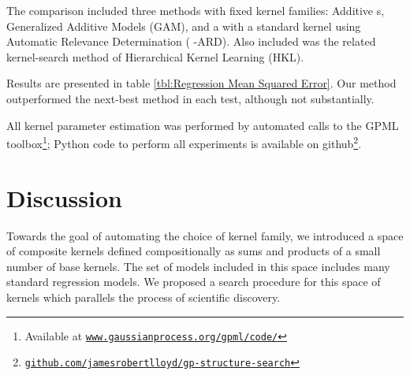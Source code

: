 
The comparison included three methods with fixed kernel families: Additive \gp{}s, Generalized Additive Models (GAM), and a \gp{} with a standard \kSE{} kernel using Automatic Relevance Determination (\gp{} \kSE{}-ARD). 
Also included was the related kernel-search method of Hierarchical Kernel Learning (HKL).

Results are presented in table \ref{tbl:Regression Mean Squared Error}.  Our method outperformed the next-best method in each test, although not substantially.

All \gp{} kernel parameter estimation was performed by automated calls to the GPML toolbox\footnote{Available at 
\href{http://www.gaussianprocess.org/gpml/code/}
{\texttt{www.gaussianprocess.org/gpml/code/}}
}; Python code to perform all experiments is available on github\footnote{
\href{http://www.github.com/jamesrobertlloyd/gp-structure-search}
{\texttt{github.com/jamesrobertlloyd/gp-structure-search}}
}.

\section{Discussion}
\label{sec:construction:discussion}


Towards the goal of automating the choice of kernel family, we introduced a space of composite kernels defined compositionally as sums and products of a small number of base kernels.  
The set of models included in this space includes many standard regression models.
We proposed a search procedure for this space of kernels which parallels the process of scientific discovery.

